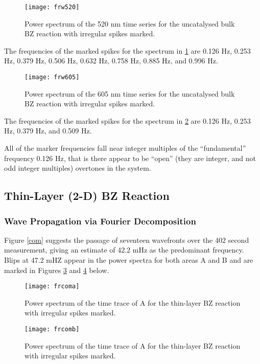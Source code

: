 \documentclass{article}
\begin{document}
\begin{figure}[H]
\texttt{[image: frw520]}
\centering
\caption{Power spectrum of the 520 nm time series for the uncatalysed bulk BZ 
reaction with irregular spikes marked.}
\label{ftw520}
\end{figure}

The frequencies of the marked spikes for the spectrum in \ref{ftw520} are
0.126 Hz, 0.253 Hz, 0.379 Hz, 0.506 Hz, 0.632 Hz, 0.758 Hz, 0.885 Hz, and 0.996 Hz.

\begin{figure}[H]
\texttt{[image: frw605]}
\centering
\caption{Power spectrum of the 605 nm time series for the uncatalysed bulk BZ 
reaction with irregular spikes marked.}
\label{ftw605}
\end{figure}

The frequencies of the marked spikes for the spectrum in \ref{ftw605} are
0.126 Hz, 0.253 Hz, 0.379 Hz, and 0.509 Hz.

All of the marker frequencies fall near integer multiples of the ``fundamental'' frequency
0.126 Hz, that is there appear to be ``open'' (they are integer, and not odd integer multiples)
overtones in the system.

\subsection{Thin-Layer (2-D) BZ Reaction}

\subsubsection{Wave Propagation via Fourier Decomposition}

Figure \ref{com} suggests the passage of seventeen wavefronts over the 402 second 
measurement,  giving an estimate of 42.2 mHz as the predominant frequency. Blips at
47.2 mHZ appear in the power spectra for both areas A and B  and are marked in Figures 
\ref{compowa} and \ref{compowb} below.

\begin{figure}[H]
\texttt{[image: frcoma]}
\centering
\caption{Power spectrum of the time trace of A for the thin-layer BZ reaction with irregular
spikes marked.}
\label{compowa}
\end{figure}

\begin{figure}[H]
\texttt{[image: frcomb]}
\centering
\caption{Power spectrum of the time trace of A for the thin-layer BZ reaction with irregular 
spikes marked.}
\label{compowb}
\end{figure}
\end{document}

